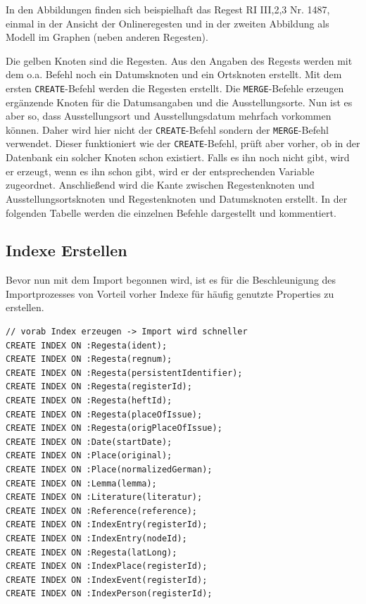 \documentclass[ngerman,]{scrreprt}
\begin{document}
In den Abbildungen finden sich beispielhaft das Regest RI III,2,3 Nr. 1487, einmal in der Ansicht der Onlineregesten und in der zweiten Abbildung als Modell im Graphen (neben anderen Regesten).

Die gelben Knoten sind die Regesten. Aus den Angaben des Regests werden mit dem o.a. Befehl noch ein Datumsknoten und ein Ortsknoten erstellt. Mit dem ersten \texttt{CREATE}-Befehl werden die Regesten erstellt. Die \texttt{MERGE}-Befehle erzeugen ergänzende Knoten für die Datumsangaben und die Ausstellungsorte. Nun ist es aber so, dass Ausstellungsort und Ausstellungsdatum mehrfach vorkommen können. Daher wird hier nicht der \texttt{CREATE}-Befehl sondern der \texttt{MERGE}-Befehl verwendet. Dieser funktioniert wie der \texttt{CREATE}-Befehl, prüft aber vorher, ob in der Datenbank ein solcher Knoten schon existiert. Falls es ihn noch nicht gibt, wird er erzeugt, wenn es ihn schon gibt, wird er der entsprechenden Variable zugeordnet. Anschließend wird die Kante zwischen Regestenknoten und Ausstellungsortsknoten und Regestenknoten und Datumsknoten erstellt. In der folgenden Tabelle werden die einzelnen Befehle dargestellt und kommentiert.

\subsection{Indexe Erstellen}\label{indexe-erstellen}

Bevor nun mit dem Import begonnen wird, ist es für die Beschleunigung des Importprozesses von Vorteil vorher Indexe für häufig genutzte Properties zu erstellen.

\begin{verbatim}
// vorab Index erzeugen -> Import wird schneller
CREATE INDEX ON :Regesta(ident);
CREATE INDEX ON :Regesta(regnum);
CREATE INDEX ON :Regesta(persistentIdentifier);
CREATE INDEX ON :Regesta(registerId);
CREATE INDEX ON :Regesta(heftId);
CREATE INDEX ON :Regesta(placeOfIssue);
CREATE INDEX ON :Regesta(origPlaceOfIssue);
CREATE INDEX ON :Date(startDate);
CREATE INDEX ON :Place(original);
CREATE INDEX ON :Place(normalizedGerman);
CREATE INDEX ON :Lemma(lemma);
CREATE INDEX ON :Literature(literatur);
CREATE INDEX ON :Reference(reference);
CREATE INDEX ON :IndexEntry(registerId);
CREATE INDEX ON :IndexEntry(nodeId);
CREATE INDEX ON :Regesta(latLong);
CREATE INDEX ON :IndexPlace(registerId);
CREATE INDEX ON :IndexEvent(registerId);
CREATE INDEX ON :IndexPerson(registerId);
\end{verbatim}
\end{document}
